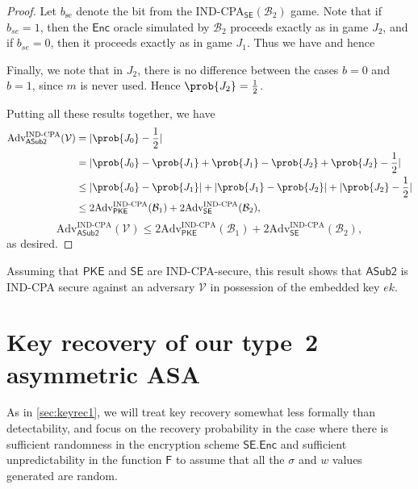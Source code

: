 \begin{proof}
Let $b_\text{se}$ denote the bit from the IND-CPA$_\mathsf{SE}(\mathcal{B}_2)$ game. Note that if $b_{se}=1$, then the $\mathsf{Enc}$ oracle simulated by $\mathcal{B}_2$ proceeds exactly as in game $J_2$, and if $b_{se}=0$, then it proceeds exactly as in game $J_1$. Thus we have
and hence

Finally, we note that in $J_2$, there is no difference between the cases $b=0$ and $b=1$, since $m$ is never used. Hence $\prob{J_2}=\frac{1}{2}$.

Putting all these results together, we have
\iffullversion
\begin{align*}
\mathrm{Adv}^{\mathrm{IND}\text{-}\mathrm{CPA}}_{\mathsf{ASub2}}(\mathcal{V})
&= |\prob{J_0}-\frac{1}{2}| \\
&= |\prob{J_0}-\prob{J_1}+\prob{J_1}-\prob{J_2}+\prob{J_2}-\frac{1}{2}| \\
&\le |\prob{J_0}-\prob{J_1}|+|\prob{J_1}-\prob{J_2}|+|\prob{J_2}-\frac{1}{2}| \\
&\le 2\mathrm{Adv}^{\mathrm{IND}\text{-}\mathrm{CPA}}_{\mathsf{PKE}}(\mathcal{B}_1) + 2\mathrm{Adv}^{\mathrm{IND}\text{-}\mathrm{CPA}}_{\mathsf{SE}}(\mathcal{B}_2),
\end{align*}
\else
\[
\mathrm{Adv}^{\mathrm{IND}\text{-}\mathrm{CPA}}_{\mathsf{ASub2}}(\mathcal{V})\le 2\mathrm{Adv}^{\mathrm{IND}\text{-}\mathrm{CPA}}_{\mathsf{PKE}}(\mathcal{B}_1) + 2\mathrm{Adv}^{\mathrm{IND}\text{-}\mathrm{CPA}}_{\mathsf{SE}}(\mathcal{B}_2),
\]
\fi
as desired.

\end{proof}

Assuming that $\mathsf{PKE}$ and $\mathsf{SE}$ are IND-CPA-secure, this result shows that $\mathsf{ASub2}$ is IND-CPA secure against an adversary $\mathcal{V}$ in possession of the embedded key $ek$.


\section{Key recovery of our type~2 asymmetric ASA} \label{sec:kr2}
As in \autoref{sec:keyrec1}, we will treat key recovery somewhat less formally than detectability, and focus on the recovery probability in the case where there is sufficient randomness in the encryption scheme $\mathsf{SE.Enc}$ and sufficient unpredictability in the function $\mathsf{F}$ to assume that all the $\sigma$ and $w$ values generated are random.

